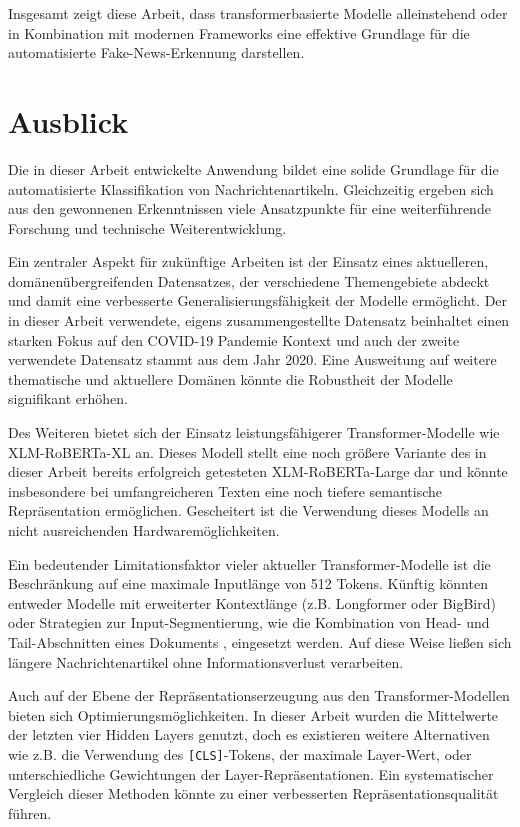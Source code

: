 Insgesamt zeigt diese Arbeit, dass transformerbasierte Modelle alleinstehend oder in Kombination mit modernen Frameworks eine effektive Grundlage 
für die automatisierte Fake-News-Erkennung darstellen.

\chapter{Ausblick}
\label{chap:ausblick}

Die in dieser Arbeit entwickelte Anwendung bildet eine solide Grundlage für die automatisierte Klassifikation von Nachrichtenartikeln. 
Gleichzeitig ergeben sich aus den gewonnenen Erkenntnissen viele Ansatzpunkte für eine weiterführende Forschung und technische Weiterentwicklung.

Ein zentraler Aspekt für zukünftige Arbeiten ist der Einsatz eines aktuelleren, domänenübergreifenden Datensatzes, der verschiedene Themengebiete abdeckt 
und damit eine verbesserte Generalisierungsfähigkeit der Modelle ermöglicht. Der in dieser Arbeit verwendete, eigens zusammengestellte Datensatz 
beinhaltet einen starken Fokus auf den COVID-19 Pandemie Kontext und auch der zweite verwendete Datensatz stammt aus dem Jahr 2020. 
Eine Ausweitung auf weitere thematische und aktuellere Domänen könnte die Robustheit der Modelle signifikant erhöhen.

Des Weiteren bietet sich der Einsatz leistungsfähigerer Transformer-Modelle wie XLM-RoBERTa-XL an. Dieses Modell stellt eine noch größere Variante des in 
dieser Arbeit bereits erfolgreich getesteten XLM-RoBERTa-Large dar und könnte insbesondere bei umfangreicheren Texten eine noch tiefere semantische 
Repräsentation ermöglichen. Gescheitert ist die Verwendung dieses Modells an nicht ausreichenden Hardwaremöglichkeiten.

Ein bedeutender Limitationsfaktor vieler aktueller Transformer-Modelle ist die Beschränkung auf eine maximale Inputlänge von 512 Tokens. 
Künftig könnten entweder Modelle mit erweiterter Kontextlänge (z.B. Longformer oder BigBird) oder Strategien zur Input-Segmentierung, 
wie die Kombination von Head- und Tail-Abschnitten eines Dokuments \cite{sun2020finetuneberttextclassification}, eingesetzt werden. 
Auf diese Weise ließen sich längere Nachrichtenartikel ohne Informationsverlust verarbeiten.

Auch auf der Ebene der Repräsentationserzeugung aus den Transformer-Modellen bieten sich Optimierungsmöglichkeiten. 
In dieser Arbeit wurden die Mittelwerte der letzten vier Hidden Layers genutzt, doch es existieren weitere Alternativen wie z.B. die Verwendung des 
\texttt{[CLS]}-Tokens, der maximale Layer-Wert, oder unterschiedliche Gewichtungen der Layer-Repräsentationen. 
Ein systematischer Vergleich dieser Methoden könnte zu einer verbesserten Repräsentationsqualität führen.

